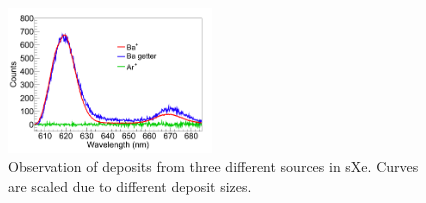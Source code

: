 \documentclass[aps,pra,reprint,superscriptaddress]{revtex4-1}
\begin{document}
\begin{figure}
\includegraphics[width=0.48\textwidth]{figures/getter_fromthesis_Ar_vs_Ba.png}
\caption{Observation of deposits from three different sources in sXe.  Curves are scaled due to different deposit sizes.}
\label{fig:ion_getter_ar}
\end{figure}






\end{document}
